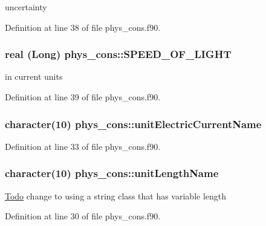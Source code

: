 uncertainty 



Definition at line 38 of file phys\_\-cons.f90.

\hypertarget{namespacephys__cons_ac31faa4bb5e82aecbdffa3b3d43a1736}{
\subsubsection[{SPEED\_\-OF\_\-LIGHT}]{\setlength{\rightskip}{0pt plus 5cm}real (Long) {\bf phys\_\-cons::SPEED\_\-OF\_\-LIGHT}}}
\label{namespacephys__cons_ac31faa4bb5e82aecbdffa3b3d43a1736}


in current units 



Definition at line 39 of file phys\_\-cons.f90.

\hypertarget{namespacephys__cons_a90b38082ef08e473377594f1485a86ad}{
\subsubsection[{unitElectricCurrentName}]{\setlength{\rightskip}{0pt plus 5cm}character(10) {\bf phys\_\-cons::unitElectricCurrentName}}}
\label{namespacephys__cons_a90b38082ef08e473377594f1485a86ad}


Definition at line 33 of file phys\_\-cons.f90.

\hypertarget{namespacephys__cons_a54d8616222c422eac2f4ae16a5c3bcba}{
\subsubsection[{unitLengthName}]{\setlength{\rightskip}{0pt plus 5cm}character(10) {\bf phys\_\-cons::unitLengthName}}}
\label{namespacephys__cons_a54d8616222c422eac2f4ae16a5c3bcba}
\begin{Desc}
\item[\hyperlink{todo__todo000002}{Todo}]change to using a string class that has variable length \end{Desc}


Definition at line 30 of file phys\_\-cons.f90.


